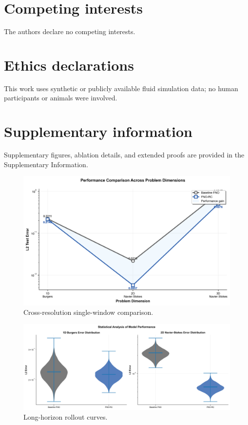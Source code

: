 \documentclass[11pt]{article}
\begin{document}
\section*{Competing interests}
The authors declare no competing interests.

\section*{Ethics declarations}
This work uses synthetic or publicly available fluid simulation data; no human participants or animals were involved.

\section*{Supplementary information}
Supplementary figures, ablation details, and extended proofs are provided in the Supplementary Information.

\begin{figure}[t]
  \centering
  \includegraphics[width=.95\linewidth]{figures/performance_comparison.png}
  \caption{Cross-resolution single-window comparison.}
  \label{fig:crossres}
\end{figure}

\begin{figure}[t]
  \centering
  \includegraphics[width=.95\linewidth]{figures/long_term_prediction.png}
  \caption{Long-horizon rollout curves.}
  \label{fig:rollout}
\end{figure}
\end{document}
